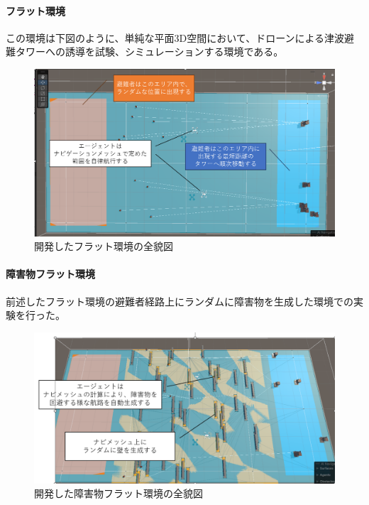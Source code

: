 \documentclass{article}[jsarticle]
\begin{document}
\paragraph{フラット環境}
この環境は下図のように、単純な平面3D空間において、ドローンによる津波避難タワーへの誘導を試験、シミュレーションする環境である。
\begin{figure}[H]
    \centering
    \includegraphics[scale=0.3]{./images/FIeld-3.png}
    \caption{
       開発したフラット環境の全貌図
    }
\end{figure}

\paragraph{障害物フラット環境}
前述したフラット環境の避難者経路上にランダムに障害物を生成した環境での実験を行った。
\begin{figure}[H]
    \centering
    \includegraphics[scale=0.3]{./images/Field-4.png}
    \caption{
       開発した障害物フラット環境の全貌図
    }
\end{figure}
\end{document}
